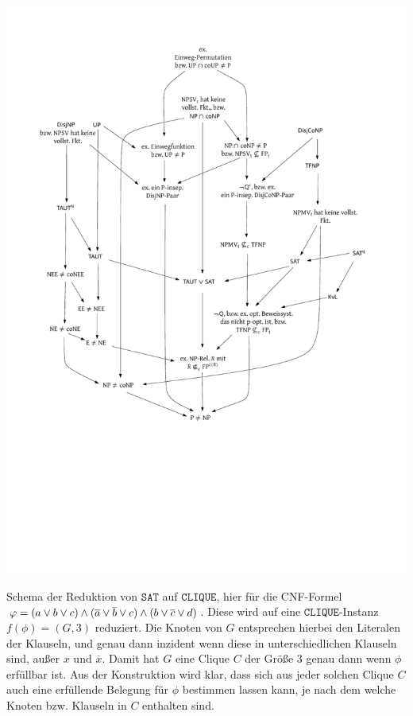 \begin{marginfigure}[-4cm]
    \centering\includegraphics[page=12]{figures.pdf}
\caption{Schema der Reduktion von $\mathtt{SAT}$ auf $\mathtt{CLIQUE}$, hier für die CNF-Formel $\smash{\phi=(a\lor b\lor c) \land (\overline{a} \lor\overline{b}\lor c)} \land \smash{(b\lor\overline{c} \lor d)}$. Diese wird auf eine $\mathtt{CLIQUE}$-Instanz $f(\phi)=(G, 3)$ reduziert. Die Knoten von $G$ entsprechen hierbei den Literalen der Klauseln, und genau dann inzident wenn diese in unterschiedlichen Klauseln sind, außer $x$ und $\overline{x}$. Damit hat $G$ eine Clique $C$ der Größe 3 genau dann wenn $\phi$ erfüllbar ist. Aus der Konstruktion wird klar, dass sich aus jeder solchen Clique $C$ auch eine erfüllende Belegung für $\phi$ bestimmen lassen kann, je nach dem welche Knoten bzw. Klauseln in $C$ enthalten sind.}\label{fig:sat-to-clique}
\end{marginfigure}

